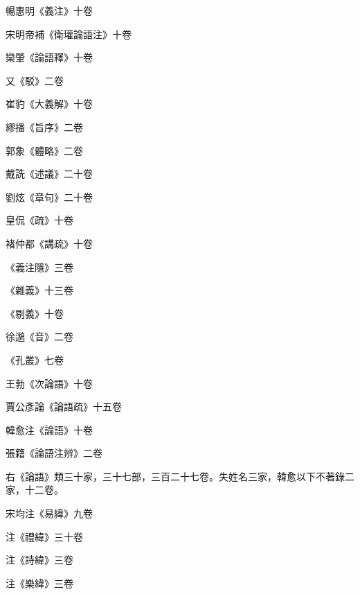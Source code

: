\begin{pinyinscope}
 暢惠明《義注》十卷



 宋明帝補《衛瓘論語注》十卷



 欒肇《論語釋》十卷



 又《駁》二卷



 崔豹《大義解》十卷



 繆播《旨序》二卷



 郭象《體略》二卷



 戴詵《述議》二十卷



 劉炫《章句》二十卷



 皇侃《疏》十卷



 褚仲都《講疏》十卷



 《義注隱》三卷



 《雜義》十三卷



 《剔義》十卷



 徐邈《音》二卷



 《孔叢》七卷



 王勃《次論語》十卷



 賈公彥論《論語疏》十五卷



 韓愈注《論語》十卷



 張籍《論語注辨》二卷



 右《論語》類三十家，三十七部，三百二十七卷。失姓名三家，韓愈以下不著錄二家，十二卷。



 宋均注《易緯》九卷



 注《禮緯》三十卷



 注《詩緯》三卷



 注《樂緯》三卷




\end{pinyinscope}
